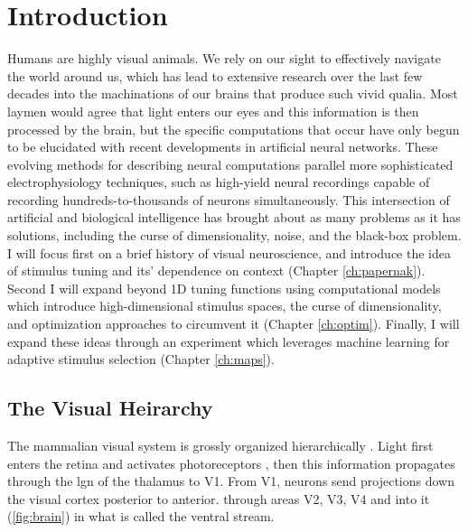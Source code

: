 
\chapter{\color{thesisBlue} Introduction} %

\label{ch:intro} %
\glsresetall



Humans are highly visual animals. We rely on our sight to effectively navigate the world around us, which has lead to extensive research over the last few decades into the machinations of our brains that produce such vivid qualia. Most laymen would agree that light enters our eyes and this information is then processed by the brain, but the specific computations that occur have only begun to be elucidated with recent developments in artificial neural networks. These evolving methods for describing neural computations parallel more sophisticated electrophysiology techniques, such as high-yield neural recordings capable of recording hundreds-to-thousands of neurons simultaneously. This intersection of artificial and biological intelligence has brought about as many problems as it has solutions, including the curse of dimensionality, noise, and the black-box problem. I will focus first on a brief history of visual neuroscience, and introduce the idea of stimulus tuning and its' dependence on context (Chapter \ref{ch:papernak}). Second I will expand beyond 1D tuning functions using computational models which introduce high-dimensional stimulus spaces, the curse of dimensionality, and optimization approaches to circumvent it (Chapter \ref{ch:optim}). Finally, I will expand these ideas through an experiment which leverages machine learning for adaptive stimulus selection (Chapter \ref{ch:maps}).

\section{The Visual Heirarchy}
The mammalian visual system is grossly organized hierarchically \citep{Felleman1991, Barone2000, Batardiere2002}. Light first enters the retina and activates photoreceptors \citep{Field2010}, then this information propagates through the \gls{lgn} of the thalamus to V1. From V1, neurons send projections down the visual cortex posterior to anterior.  through areas V2, V3, V4 and into \gls{it} (\ref{fig:brain}) in what is called the ventral stream. 

